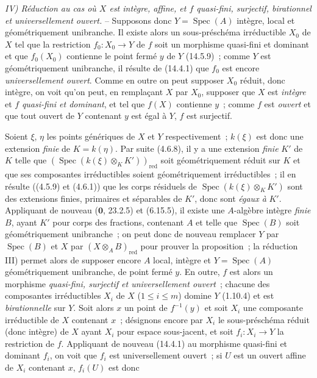 \emph{IV) Réduction au cas où $X$ est intègre, affine, et $f$ quasi-fini,
surjectif, birationnel et universellement ouvert.} -- Supposons donc $Y=\operatorname{Spec}(A)$
intègre, local et géométriquement unibranche. Il existe alors un sous-préschéma
irréductible $X_0$ de $X$ tel que la restriction $f_0:X_0\to Y$ de $f$ soit un
morphisme quasi-fini et dominant et que $f_0(X_0)$ contienne le point fermé $y$ de
$Y$ (14.5.9)~; comme $Y$ est géométriquement unibranche, il résulte de (14.4.1) que
$f_0$ est encore \emph{universellement ouvert}. Comme en outre on peut supposer
$X_0$ réduit, donc intègre, on voit qu'on peut, en remplaçant $X$ par $X_0$,
supposer que $X$ est \emph{intègre} et $f$ \emph{quasi-fini et dominant}, et tel que
$f(X)$ contienne $y$~; comme $f$ est \emph{ouvert} et que tout ouvert de $Y$
contenant $y$ est égal à $Y$, $f$ est surjectif.

Soient $\xi$, $\eta$ les points génériques de $X$ et $Y$ respectivement~;
$k(\xi)$ est donc une extension \emph{finie} de $K=k(\eta)$. Par suite (4.6.8), il
y a une extension \emph{finie} $K'$ de $K$ telle que
$(\operatorname{Spec}(k(\xi)\otimes_K K'))_{\mathrm{red}}$ soit géométriquement réduit sur $K$ et
que ses composantes irréductibles soient géométriquement irréductibles~; il en
résulte ((4.5.9) et (4.6.1)) que les corps résiduels de
$\operatorname{Spec}(k(\xi)\otimes_K K')$ sont des extensions finies, primaires et séparables de
$K'$, donc sont \emph{égaux à} $K'$. Appliquant de nouveau ($\mathbf 0$, 23.2.5) et
(6.15.5), il existe une $A$-algèbre intègre \emph{finie} $B$, ayant $K'$ pour
corps des fractions, contenant $A$ et telle que $\operatorname{Spec}(B)$ soit géométriquement
unibranche~; on peut donc de nouveau remplacer $Y$ par $\operatorname{Spec}(B)$ et $X$ par
$(X\otimes_A B)_{\mathrm{red}}$ pour prouver la proposition~; la réduction III)
permet alors de supposer encore $A$ local, intègre et $Y=\operatorname{Spec}(A)$ géométriquement
unibranche, de point fermé $y$. En outre, $f$ est alors un morphisme \emph{quasi-fini,
surjectif et universellement ouvert}~; chacune des composantes irréductibles $X_i$
de $X$ ($1\leq i\leq m$) domine $Y$ (1.10.4) et est \emph{birationnelle} sur $Y$.
Soit alors $x$ un point de $f^{-1}(y)$ et soit $X_i$ une composante irréductible de
$X$ contenant $x$~; désignons encore par $X_i$ le sous-préschéma réduit (donc
intègre) de $X$ ayant $X_i$ pour espace sous-jacent, et soit $f_i:X_i\to Y$ la
restriction de $f$. Appliquant de nouveau (14.4.1) au morphisme quasi-fini et
dominant $f_i$, on voit que $f_i$ est universellement ouvert~; si $U$ est un ouvert
affine de $X_i$ contenant $x$, $f_i(U)$ est donc

